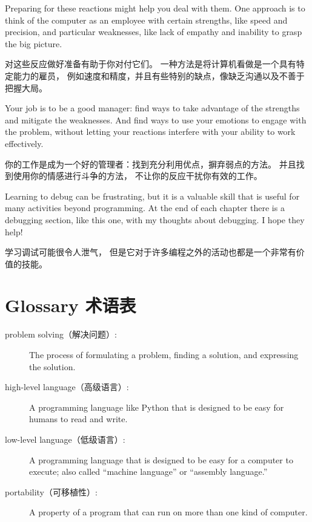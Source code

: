 \documentclass[10pt]{book}
\begin{document}
\begin{CJK}{UTF8}{gbsn}
Preparing for these reactions might help you deal with them.
One approach is to think of the computer as an employee with
certain strengths, like speed and precision, and
particular weaknesses, like lack of empathy and inability
to grasp the big picture.

对这些反应做好准备有助于你对付它们。
一种方法是将计算机看做是一个具有特定能力的雇员，
例如速度和精度，并且有些特别的缺点，像缺乏沟通以及不善于把握大局。

Your job is to be a good manager: find ways to take advantage
of the strengths and mitigate the weaknesses.  And find ways
to use your emotions to engage with the problem,
without letting your reactions interfere with your ability
to work effectively.

你的工作是成为一个好的管理者：找到充分利用优点，摒弃弱点的方法。
并且找到使用你的情感进行斗争的方法，
不让你的反应干扰你有效的工作。

Learning to debug can be frustrating, but it is a valuable skill
that is useful for many activities beyond programming.  At the
end of each chapter there is a debugging section, like this one,
with my thoughts about debugging.  I hope they help!

学习调试可能很令人泄气，
但是它对于许多编程之外的活动也都是一个非常有价值的技能。

\section{Glossary 术语表}

\begin{description}

\item[problem solving（解决问题）:]  The process of formulating a problem, finding
a solution, and expressing the solution.

\item[high-level language（高级语言）:]  A programming language like Python that
is designed to be easy for humans to read and write.

\item[low-level language（低级语言）:]  A programming language that is designed
to be easy for a computer to execute; also called ``machine language'' or
``assembly language.''

\item[portability（可移植性）:]  A property of a program that can run on more
than one kind of computer.


\end{description}
\end{CJK}
\end{document}
